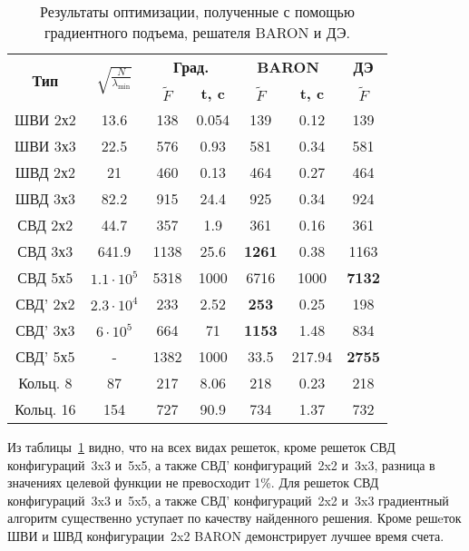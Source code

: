 \begin{table}[!h]
\centering
\caption{ Результаты оптимизации, полученные с помощью градиентного подъема, решателя BARON и ДЭ.}
\begin{tabular}{|c|c|c c|c c|c|}
    \hline
    \multirow{2}{*}{\textbf{Тип}} & \multirow{2}{*}{$\sqrt{\frac{N}{\lambda_{\min}}}$} & \multicolumn{2}{c}{\textbf{Град.}} & \multicolumn{2}{|c|}{\textbf{BARON}} & \textbf{ДЭ}\\
    & & \textbf{$\tilde{F}$} & \textbf{t, c} & \textbf{$\tilde{F}$} & \textbf{t, c} & \textbf{$\tilde{F}$} \\
    \hline
    ШВИ 2х2 & 13.6 & 138 & {0.054} & {139} & 0.12 & {139}  \\
    ШВИ 3х3 & 22.5 & 576 & 0.93 & {581} & {0.34} & {581}  \\
    ШВД 2х2 & 21 & 460 & {0.13} & {464} & 0.27 &  {464}  \\
    ШВД 3х3 & 82.2 & 915 & 24.4 & {925} & {0.34} & 924   \\
    СВД 2х2 & 44.7& 357 & 1.9 & {361} & {0.16} & {361}   \\
    СВД 3х3 & 641.9& 1138 & 25.6 & \textbf{1261} & {0.38} & 1163 \\
    СВД 5х5 & $1.1\cdot10^{5}$ & 5318 & 1000 & 6716 & 1000 & \textbf{7132}  \\
    СВД' 2х2 & $2.3\cdot10^{4}$ & 233 & 2.52 & \textbf{253} & {0.25} & 198  \\
    СВД' 3х3 & $6\cdot10^5$& 664 & 71 & \textbf{1153} & {1.48} & 834  \\
    СВД' 5х5 & - & 1382 & 1000 & 33.5 & 217.94 & \textbf{2755}   \\
    Кольц. 8 & 87 & 217 & 8.06 & 218 & {0.23} & 218  \\
    Кольц. 16          & 154 & 727 & 90.9 & 734 & {1.37} & 732  \\
    \hline
\end{tabular}
\label{tab:results_0}
\end{table}

Из таблицы~\ref{tab:results_0} видно, что на всех видах решеток, кроме решеток СВД конфигураций~3x3 и~5x5, а также СВД' конфигураций~2x2 и~3x3, разница в значениях целевой функции не превосходит 1\%. Для решеток СВД конфигураций~3x3 и~5x5, а также СВД' конфигураций~2x2 и~3x3 градиентный алгоритм существенно уступает по качеству найденного решения. Кроме решeток ШВИ и ШВД конфигурации~2x2 BARON демонстрирует лучшее время счета.

